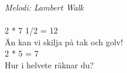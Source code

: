 {\footnotesize\textit{Melodi: Lambert Walk}}\\
\\
2 * 7 1/2 = 12\\
Än kan vi skilja på tak och golv!\\
2 * 5 = 7\\
Hur i helvete räknar du?\\
